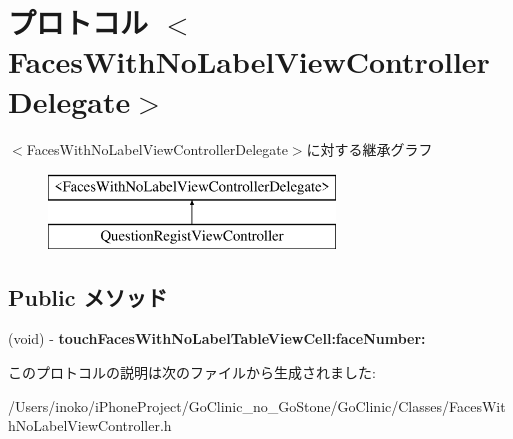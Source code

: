 \hypertarget{protocol_faces_with_no_label_view_controller_delegate-p}{
\section{プロトコル $<$FacesWithNoLabelViewControllerDelegate$>$}
\label{protocol_faces_with_no_label_view_controller_delegate-p}
}
$<$FacesWithNoLabelViewControllerDelegate$>$に対する継承グラフ\begin{figure}[H]
\begin{center}
\leavevmode
\includegraphics[height=2.000000cm]{protocol_faces_with_no_label_view_controller_delegate-p}
\end{center}
\end{figure}
\subsection*{Public メソッド}
\begin{DoxyCompactItemize}
\item 
\hypertarget{protocol_faces_with_no_label_view_controller_delegate-p_a3c46e0d1b61040a7cb90f102b1e9c206}{
(void) -\/ {\bfseries touchFacesWithNoLabelTableViewCell:faceNumber:}}
\label{protocol_faces_with_no_label_view_controller_delegate-p_a3c46e0d1b61040a7cb90f102b1e9c206}

\end{DoxyCompactItemize}


このプロトコルの説明は次のファイルから生成されました:\begin{DoxyCompactItemize}
\item 
/Users/inoko/iPhoneProject/GoClinic\_\-no\_\-GoStone/GoClinic/Classes/FacesWithNoLabelViewController.h\end{DoxyCompactItemize}
